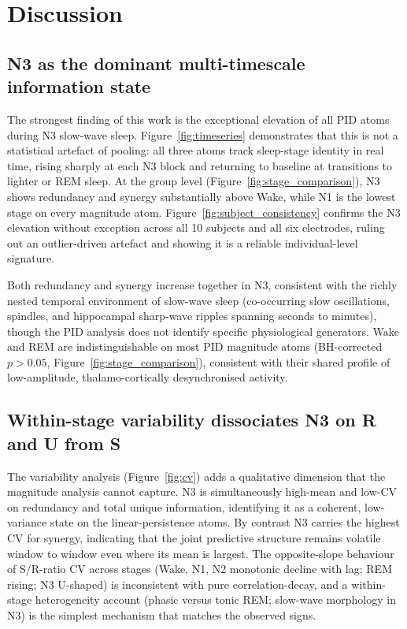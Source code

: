 \documentclass[11pt,a4paper]{article}
\begin{document}
\section{Discussion}

\subsection{N3 as the dominant multi-timescale information state}

The strongest finding of this work is the exceptional elevation of all PID
atoms during N3 slow-wave sleep.  Figure~\ref{fig:timeseries} demonstrates
that this is not a statistical artefact of pooling: all three atoms track
sleep-stage identity in real time, rising sharply at each N3 block and
returning to baseline at transitions to lighter or REM sleep.  At the
group level (Figure~\ref{fig:stage_comparison}), N3 shows redundancy and
synergy substantially above Wake, while N1 is the lowest stage on every
magnitude atom.  Figure~\ref{fig:subject_consistency} confirms the N3
elevation without exception across all 10 subjects and all six electrodes,
ruling out an outlier-driven artefact and showing it is a reliable
individual-level signature.

Both redundancy and synergy increase together in N3, consistent with the
richly nested temporal environment of slow-wave sleep (co-occurring slow
oscillations, spindles, and hippocampal sharp-wave ripples spanning
seconds to minutes), though the PID analysis does not identify specific
physiological generators.  Wake and REM are indistinguishable on most PID
magnitude atoms (BH-corrected $p > 0.05$,
Figure~\ref{fig:stage_comparison}), consistent with their shared profile
of low-amplitude, thalamo-cortically desynchronised activity.

\subsection{Within-stage variability dissociates N3 on R and U from S}

The variability analysis (Figure~\ref{fig:cv}) adds a qualitative
dimension that the magnitude analysis cannot capture.  N3 is
simultaneously high-mean and low-CV on redundancy and total unique
information, identifying it as a coherent, low-variance state on the
linear-persistence atoms.  By contrast N3 carries the highest CV for
synergy, indicating that the joint predictive structure remains volatile
window to window even where its mean is largest.  The opposite-slope
behaviour of S/R-ratio CV across stages (Wake, N1, N2 monotonic decline
with lag; REM rising; N3 U-shaped) is inconsistent with pure
correlation-decay, and a within-stage heterogeneity account (phasic
versus tonic REM; slow-wave morphology in N3) is the simplest mechanism
that matches the observed signs.
\end{document}
